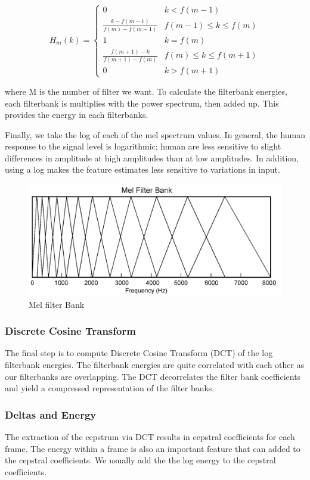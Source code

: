 \begin{equation}
	H_m(k) =
	\begin{cases}
		0 & k<f(m-1) \\
		\frac{k - f(m-1)}{f(m) - f(m-1)} & f(m-1) \leq k \leq f(m) \\
		1 & k = f(m)\\
		\frac{f(m+1) - k }{f(m+1) - f(m)} & f(m) \leq k \leq f(m+1) \\
		0 & k>f(m+1)
	\end{cases}
\end{equation}

where M is the number of filter we want.    
To calculate the filterbank energies, each filterbank is multiplies with the power spectrum, then added up. This provides the energy in each filterbanks.


Finally, we take the log of each of the mel spectrum values. In general, the human response to the signal level is logarithmic; human are less sensitive to slight differences in amplitude at high amplitudes than at low amplitudes. In addition, using a log makes the feature estimates less sensitive to variations in input.
\begin{figure}[h]
	\centerline{\includegraphics[scale=0.35]{images/filterbanks.png}}
	\caption{Mel filter Bank}
\end{figure}


\subsubsection{Discrete Cosine Transform}
The final step is to compute Discrete Cosine Transform (DCT) of the log filterbank energies. The filterbank energies are quite correlated with each other as our filterbanks are overlapping. The DCT decorrelates the filter bank coefficients and yield a compressed representation of the filter banks.

\subsubsection{Deltas and Energy}
The extraction of the cepstrum via DCT results in cepstral coefficients for each frame. The energy within a frame is also an important feature that can added to the cepstral coefficients. We usually add the the log energy to the cepstral coefficients.



